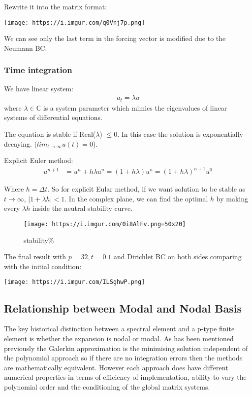 \documentclass[
  a4paper,
  10pt]{article}
\begin{document}
Rewrite it into the matrix format:

\texttt{[image: https://i.imgur.com/q0Vnj7p.png]}

We can see only the last term in the forcing vector is modified due to
the Neumann BC.

\hypertarget{time-integration}{%
\subsubsection{Time integration}\label{time-integration}}

We have linear system: \begin{align}
u_t = \lambda u
\end{align} where \(\lambda\in\mathbb{C}\) is a system parameter which
mimics the eigenvalues of linear systems of differential equations.

The equation is stable if Real(\(\lambda\)) \(\leq 0\). In this case the
solution is exponentially decaying. (\(lim_{t\to\infty}u(t) = 0\)).

Explicit Euler method: \begin{align}
u^{n+1} &= u^{n} + h\lambda u^{n}
=(1+h\lambda)u^{n}
=(1+h\lambda)^{n+1}u^0
\end{align}

Where \(h=\Delta t\). So for explicit Eular method, if we want solution
to be stable as \(t\to\infty\), \(|1+\lambda h|<1\). In the complex
plane, we can find the optimal \(h\) by making every \(\lambda h\)
inside the neutral stability curve.

\begin{figure}
\centering
\texttt{[image: https://i.imgur.com/0i8AlFv.png=50x20]}
\caption{stability\%}
\end{figure}

The final result with \(p=32, t=0.1\) and Dirichlet BC on both sides
comparing with the initial condition:

\texttt{[image: https://i.imgur.com/ILSghwP.png]}

\hypertarget{relationship-between-modal-and-nodal-basis}{%
\subsection{Relationship between Modal and Nodal
Basis}\label{relationship-between-modal-and-nodal-basis}}

The key historical distinction between a spectral element and a p-type
finite element is whether the expansion is nodal or modal. As has been
mentioned previously the Galerkin approximation is the minimising
solution independent of the polynomial approach so if there are no
integration errors then the methods are mathematically equivalent.
However each approach does have different numerical properties in terms
of efficiency of implementation, ability to vary the polynomial order
and the conditioning of the global matrix systems.
\end{document}
